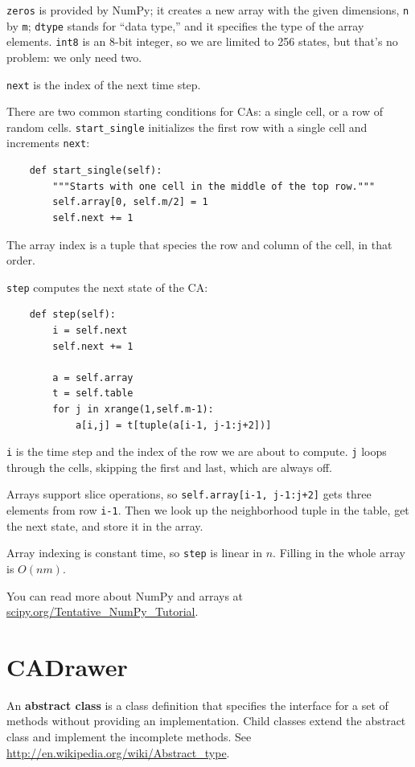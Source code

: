 \documentclass[10pt]{book}
\begin{document}
{\tt zeros} is provided by NumPy; it creates a new array with
the given dimensions, {\tt n} by {\tt m}; {\tt dtype} stands
for ``data type,'' and it specifies the type of the array elements.
{\tt int8} is an 8-bit integer, so we are limited to 256 states,
but that's no problem: we only need two.

{\tt next} is the index of the next time step.

There are two common starting conditions for CAs: a single cell, or a row
of random cells.  \verb"start_single" initializes the first row with
a single cell and increments {\tt next}:

\begin{verbatim}
    def start_single(self):
        """Starts with one cell in the middle of the top row."""
        self.array[0, self.m/2] = 1
        self.next += 1
\end{verbatim}
%
The array index is a tuple that species the row and column of the cell,
in that order.

{\tt step} computes the next state of the CA:

\begin{verbatim}
    def step(self):
        i = self.next
        self.next += 1

        a = self.array
        t = self.table
        for j in xrange(1,self.m-1):
            a[i,j] = t[tuple(a[i-1, j-1:j+2])]
\end{verbatim}

{\tt i} is the time step and the index of the row we are about to
compute.  {\tt j} loops through the cells, skipping the first and
last, which are always off.

Arrays support slice operations, so {\tt self.array[i-1, j-1:j+2]}
gets three elements from row {\tt i-1}.
Then we look up the neighborhood tuple in the table, get
the next state, and store it in the array.

Array indexing is constant time, so {\tt step} is linear in $n$.
Filling in the whole array is $O(nm)$.

You can read more about NumPy and arrays at
\url{scipy.org/Tentative_NumPy_Tutorial}.


\section{CADrawer}

An {\bf abstract class} is a class definition that specifies the
interface for a set of methods without providing an implementation.
Child classes extend the abstract class and implement the incomplete
methods.  See \url{http://en.wikipedia.org/wiki/Abstract_type}.
\end{document}
